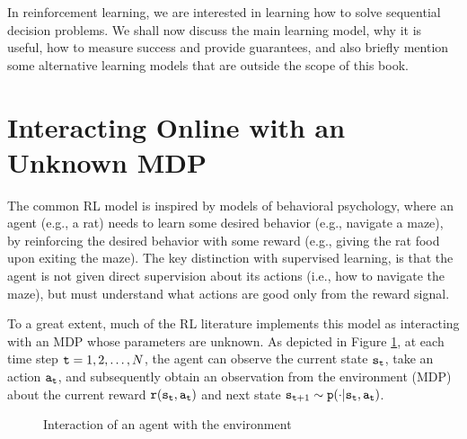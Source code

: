 In reinforcement learning, we are interested in learning how to solve sequential decision problems. We shall now discuss the main learning model, why it is useful, how to measure success and provide guarantees, and also briefly mention some alternative learning models that are outside the scope of this book.

\section{Interacting Online with an Unknown MDP}

The common RL model is inspired by models of behavioral psychology, where an agent (e.g., a rat) needs to learn some desired behavior (e.g., navigate a maze), by reinforcing the desired behavior with some reward (e.g., giving the rat food upon exiting the maze). The key distinction with supervised learning, is that the agent is not given direct supervision about its actions (i.e., how to navigate the maze), but must understand what actions are good only from the reward signal.

To a great extent, much of the RL literature implements this model as interacting with an MDP whose parameters are unknown. As depicted in Figure \ref{fig:RL_model_fig}, at each time step ${\tt t} = 1,2,\dots, N$, the agent can observe the current state ${\tt s}_{\tt t}$, take an action ${\tt a}_{\tt t}$, and subsequently obtain an observation from the environment (MDP) about the current reward ${\tt r}({\tt s}_{\tt t},{\tt a}_{\tt t})$ and next state ${\tt s}_{{\tt t}+1}\sim {\tt p}(\cdot | {\tt s}_{\tt t}, {\tt a}_{\tt t})$.

\begin{figure}[h]
    \centering
    \caption{Interaction of an agent with the environment}
    \label{fig:RL_model_fig}
\end{figure}

